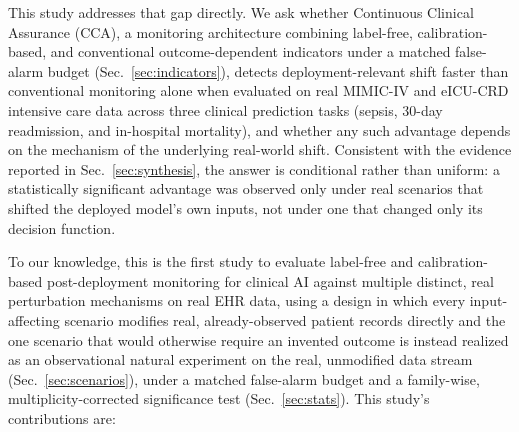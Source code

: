 \documentclass[preprintsapa,article,submit,oneauthor]{Definitions/mdpi}
\begin{document}
This study addresses that gap directly. We ask whether Continuous Clinical Assurance (CCA), a monitoring architecture combining label-free, calibration-based, and conventional outcome-dependent indicators under a matched false-alarm budget (Sec.~\ref{sec:indicators}), detects deployment-relevant shift faster than conventional monitoring alone when evaluated on real MIMIC-IV and eICU-CRD intensive care data across three clinical prediction tasks (sepsis, 30-day readmission, and in-hospital mortality), and whether any such advantage depends on the mechanism of the underlying real-world shift. Consistent with the evidence reported in Sec.~\ref{sec:synthesis}, the answer is conditional rather than uniform: a statistically significant advantage was observed only under real scenarios that shifted the deployed model's own inputs, not under one that changed only its decision function.

To our knowledge, this is the first study to evaluate label-free and calibration-based post-deployment monitoring for clinical AI against multiple distinct, real perturbation mechanisms on real EHR data, using a design in which every input-affecting scenario modifies real, already-observed patient records directly and the one scenario that would otherwise require an invented outcome is instead realized as an observational natural experiment on the real, unmodified data stream (Sec.~\ref{sec:scenarios}), under a matched false-alarm budget and a family-wise, multiplicity-corrected significance test (Sec.~\ref{sec:stats}). This study's contributions are:
\end{document}
